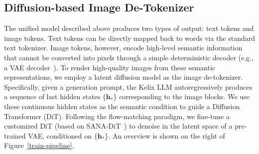 \documentclass[11pt, a4paper, logo, copyright]{googledeepmind}
\begin{document}
\subsection{Diffusion-based Image De-Tokenizer}
The unified model described above produces two types of output: text tokens and image tokens. Text tokens can be directly mapped back to words via the standard text tokenizer. Image tokens, however, encode high-level semantic information that cannot be converted into pixels through a simple deterministic decoder (e.g., a VAE decoder~\citep{yang2024cogvideox}).
%
To render high-quality images from these semantic representations, we employ a latent diffusion model as the image de-tokenizer. Specifically, given a generation prompt, the Kelix LLM autoregressively produces a sequence of last hidden states $\{\mathbf{h}_*\}$ corresponding to the image blocks. We use these continuous hidden states as the semantic condition to guide a Diffusion Transformer (DiT). Following the flow-matching paradigm, we fine-tune a customized DiT (based on SANA-DiT~\citep{xie2024sana}) to denoise in the latent space of a pre-trained VAE, conditioned on $\{\mathbf{h}_*\}$. An overview is shown on the right of Figure~\ref{train-pipeline}.
\end{document}
